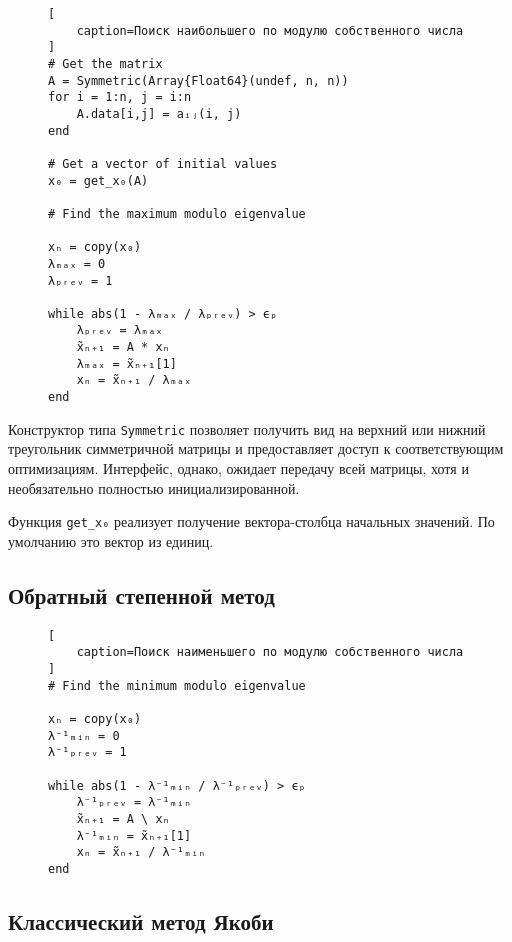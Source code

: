 \begin{figure}[H]
\begin{lstlisting}[
    caption=Поиск наибольшего по модулю собственного числа
]
# Get the matrix
A = Symmetric(Array{Float64}(undef, n, n))
for i = 1:n, j = i:n
    A.data[i,j] = aᵢⱼ(i, j)
end

# Get a vector of initial values
x₀ = get_x₀(A)

# Find the maximum modulo eigenvalue

xₙ = copy(x₀)
λₘₐₓ = 0
λₚᵣₑᵥ = 1

while abs(1 - λₘₐₓ / λₚᵣₑᵥ) > ϵₚ
    λₚᵣₑᵥ = λₘₐₓ
    x̃ₙ₊₁ = A * xₙ
    λₘₐₓ = x̃ₙ₊₁[1]
    xₙ = x̃ₙ₊₁ / λₘₐₓ
end
\end{lstlisting}
\end{figure}

Конструктор типа {\footnotesize \texttt{Symmetric}} позволяет получить вид на верхний или нижний треугольник симметричной матрицы и предоставляет доступ к соответствующим оптимизациям. Интерфейс, однако, ожидает передачу всей матрицы, хотя и необязательно полностью инициализированной. \par

\vspace{\baselineskip}

Функция {\footnotesize \texttt{get\_x₀}} реализует получение вектора-столбца начальных значений. По умолчанию это вектор из единиц.

\subsection{Обратный степенной метод}

\begin{figure}[H]
\begin{lstlisting}[
    caption=Поиск наименьшего по модулю собственного числа
]
# Find the minimum modulo eigenvalue

xₙ = copy(x₀)
λ⁻¹ₘᵢₙ = 0
λ⁻¹ₚᵣₑᵥ = 1

while abs(1 - λ⁻¹ₘᵢₙ / λ⁻¹ₚᵣₑᵥ) > ϵₚ
    λ⁻¹ₚᵣₑᵥ = λ⁻¹ₘᵢₙ
    x̃ₙ₊₁ = A \ xₙ
    λ⁻¹ₘᵢₙ = x̃ₙ₊₁[1]
    xₙ = x̃ₙ₊₁ / λ⁻¹ₘᵢₙ
end
\end{lstlisting}
\end{figure}

\subsection{Классический метод Якоби}

